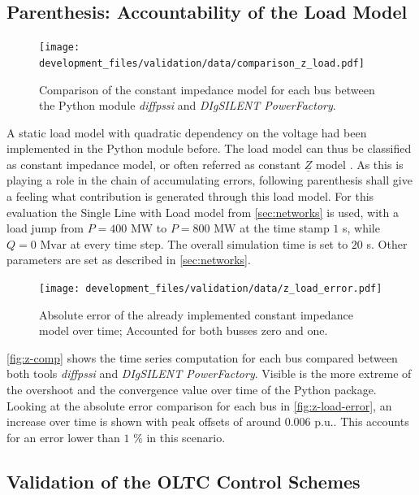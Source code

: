 \subsection{Parenthesis: Accountability of the Load Model}
\label{sec:validation-load-model}

\begin{figure}[htbp!]
    \centering
    \texttt{[image: development\_files/validation/data/comparison\_z\_load.pdf]}
    \caption[Comparison of the constant impedance model for each bus]{Comparison of the constant impedance model for each bus between the Python module \textit{diffpssi} and \textit{DIgSILENT PowerFactory}.}
    \label{fig:z-comp}
\end{figure}

A static load model with quadratic dependency on the voltage had been implemented in the Python module before.
The load model can thus be classified as constant impedance model, or often referred as constant $\underline{Z}$ model \autocite{IEEELoadModeling_2022}. 
As this is playing a role in the chain of accumulating errors, following parenthesis shall give a feeling what contribution is generated through this load model.
For this evaluation the Single Line with Load model from \autoref{sec:networks} is used, with a load jump from $P=400\text{ MW}$ to $P=800\text{ MW}$ at the time stamp $1$ s, while $Q=0\text{ Mvar}$ at every time step.
The overall simulation time is set to $20$ s.
Other parameters are set as described in \autoref{sec:networks}.

\begin{figure}[htbp!]
    \centering
    \texttt{[image: development\_files/validation/data/z\_load\_error.pdf]}
    \caption[Absolute error comparison of the constant impedance model]{Absolute error of the already implemented constant impedance model over time; Accounted for both busses zero and one.}
    \label{fig:z-load-error}
\end{figure}

\autoref{fig:z-comp} shows the time series computation for each bus compared between both tools \textit{diffpssi} and \textit{DIgSILENT PowerFactory}.
Visible is the more extreme of the overshoot and the convergence value over time of the Python package.
Looking at the absolute error comparison for each bus in \autoref{fig:z-load-error}, an increase over time is shown with peak offsets of around $0.006$ p.u..
This accounts for an error lower than $1$ \% in this scenario.

\subsection{Validation of the OLTC Control Schemes}
\label{sec:validation-oltc-schemes}

